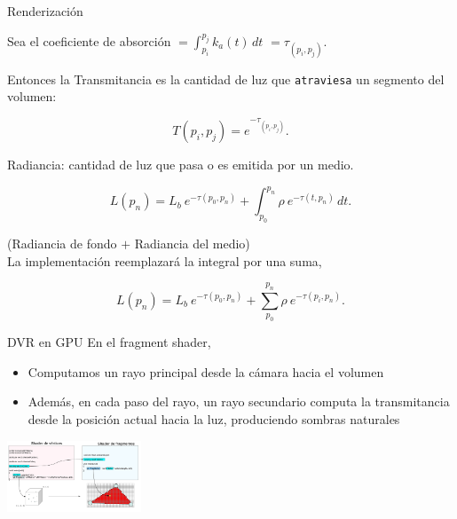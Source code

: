 \documentclass[spanish]{beamer}
\begin{document}
\begin{frame}{Renderización}


Sea el coeficiente de absorción $ = \int_{p_i}^{p_j} k_a(t) \, dt$  $ = \tau_{(p_i, p_j)}$.


Entonces la Transmitancia es la cantidad de luz que \texttt{atraviesa} un segmento del volumen:

\begin{equation*}
  T(p_i,p_j) = e^{-\tau_{(p_i, p_j)}}.
\end{equation*}

Radiancia: cantidad de luz que pasa o es emitida por un medio.

\begin{equation*}
  L(p_n) = L_b \ e^{-\tau(p_0, p_n)} + \int_{p_0}^{p_n} \rho \ e^{-\tau(t,p_n)} \, dt.
\end{equation*}

(Radiancia de fondo $+$ Radiancia del medio) \\

La implementación reemplazará la integral por una suma,

\begin{equation*}
  L(p_n) = L_b \ e^{-\tau(p_0, p_n)} + \sum_{p_0}^{p_n} \rho \ e^{-\tau(p_i,p_n)}.
\end{equation*}


\end{frame}


\begin{frame}{DVR en GPU}
\centering
En el fragment shader,
\begin{itemize}
\item Computamos un rayo principal desde la cámara hacia el volumen
\item Además, en cada paso del rayo, un rayo secundario computa la transmitancia desde la posición actual hacia la luz, produciendo sombras naturales
\end{itemize}


\centerline{\includegraphics[width=4cm]{../figures/fragmentshader}}


\end{frame}
\end{document}
